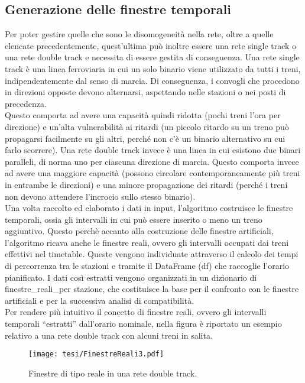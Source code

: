 \documentclass{report}
\begin{document}
\subsection{Generazione delle finestre temporali}
Per poter gestire quelle che sono le disomogeneità nella rete, oltre a quelle elencate precedentemente, quest'ultima può inoltre essere una rete single track o una rete double track e necessita di essere gestita di conseguenza.
Una rete single track è una linea ferroviaria in cui un solo binario viene utilizzato da tutti i treni,
indipendentemente dal senso di marcia. Di conseguenza, i convogli che procedono in direzioni opposte
devono alternarsi, aspettando nelle stazioni o nei posti di precedenza.\\ Questo comporta ad avere una capacità quindi ridotta (pochi treni l'ora per direzione) e un'alta vulnerabilità ai ritardi (un piccolo ritardo su un treno può propagarsi facilmente su gli altri, perché non
c'è un binario alternativo su cui farlo scorrere).
Una rete double track invece è una linea in cui esistono due binari paralleli, di norma uno per ciascuna
direzione di marcia.
Questo comporta invece ad avere una maggiore capacità (possono circolare contemporaneamente più
treni in entrambe le direzioni) e una minore propagazione dei ritardi (perché i treni non devono attendere
l'incrocio sullo stesso binario). \\
Una volta raccolto ed elaborato i dati in input, l'algoritmo costruisce le finestre temporali, ossia gli intervalli in cui può essere inserito o meno un treno aggiuntivo.
Questo perchè accanto alla costruzione delle finestre artificiali, l’algoritmo ricava anche le finestre reali, ovvero gli intervalli occupati dai treni effettivi nel timetable. Queste vengono individuate attraverso il calcolo dei tempi di percorrenza tra le stazioni e tramite il DataFrame (df) che raccoglie l’orario pianificato. I dati così estratti vengono organizzati in un dizionario di finestre\_reali\_per stazione, che costituisce la base per il confronto con le finestre artificiali e per la successiva analisi di compatibilità. \\
Per rendere più intuitivo il concetto di finestre reali, ovvero gli intervalli temporali “estratti” dall’orario nominale, nella figura è riportato un esempio relativo a una rete double track con alcuni treni in salita. 
\begin{figure}[H]
    \centering
    \texttt{[image: tesi/FinestreReali3.pdf]}
    \caption{Finestre di tipo reale in una rete double track.}
    \label{fig:placeholder}
\end{figure} 
\end{document}
